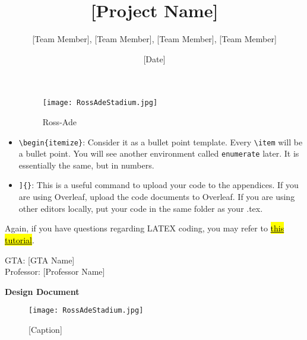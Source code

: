\documentclass[letterpaper, 11pt]{article}
\begin{document}
\begin{itemize}
    \begin{figure}[!ht]
        \centering
        \texttt{[image: RossAdeStadium.jpg]} %
        \caption{Ross-Ade}
    \end{figure}
    
    \item \verb|\begin{itemize}|: Consider it as a bullet point template. Every \verb|\item| will be a bullet point. You will see another environment called \verb|enumerate| later. It is essentially the same, but in numbers. 

    \item \verb|]{}|: This is a useful command to upload your code to the appendices. If you are using Overleaf, upload the code documents to Overleaf. If you are using other editors locally, put your code in the same folder as your .tex. 
\end{itemize}
Again, if you have questions regarding LATEX coding, you may refer to \href{https://www.overleaf.com/learn/latex/Learn_LaTeX_in_30_minutes}{\hl{this tutorial}}.


\title{[Project Name]}
\author{[Team Member], [Team Member], [Team Member], [Team Member]}
\date{[Date]}
\maketitle
\begin{center}
GTA: [GTA Name] \\
Professor: [Professor Name]
\end{center}
\begin{center}
    \textbf{Design Document} 
\end{center}

\begin{figure}[h]
    \centering
    \texttt{[image: RossAdeStadium.jpg]}
    \caption{[Caption]}
\end{figure}


\clearpage
\tableofcontents %
\end{document}
